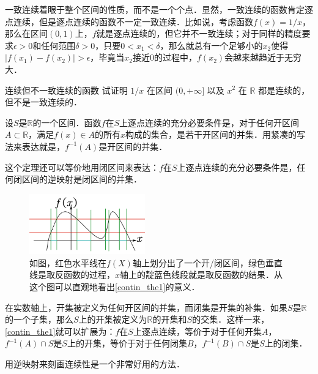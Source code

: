 一致连续着眼于整个区间的性质，而不是一个个点．显然，一致连续的函数肯定逐点连续，但是逐点连续的函数不一定一致连续．比如说，考虑函数$f(x)=1/x$，那么在区间$(0, 1)$上，$f$就是逐点连续的，但它并不一致连续；对于同样的精度要求$\epsilon>0$和任何范围$\delta>0$，只要$0<x_1<\delta$，那么就总有一个足够小的$x_2$使得$|f(x_1)-f(x_2)|>\epsilon$，毕竟当$x_2$接近$0$的过程中，$f(x_2)$会越来越趋近于无穷大．

\begin{exercise}{连续但不一致连续的函数}
试证明 $1/x$ 在区间 $(0, +\infty]$ 以及 $x^2$ 在 $\mathbb R$ 都是连续的， 但不是一致连续的．
\end{exercise}

\begin{theorem}{}\label{contin_the1}
设$S$是$\mathbb{R}$的一个区间．函数$f$在$S$上逐点连续的充分必要条件是，对于任何开区间$A\subset \mathbb{R}$，满足$f(x)\in A$的所有$x$构成的集合，是若干开区间的并集．用紧凑的写法来表达就是，$f^{-1}(A)$是开区间的并集．
\end{theorem}

这个定理还可以等价地用闭区间来表达：$f$在$S$上逐点连续的充分必要条件是，任何闭区间的逆映射是闭区间的并集．

\begin{figure}[ht]
\centering
\includegraphics[width=5cm]{./figures/contin_1.png}
\caption{如图，红色水平线在$f(X)$轴上划分出了一个开/闭区间，绿色垂直线是取反函数的过程，$x$轴上的靛蓝色线段就是取反函数的结果．从这个图可以直观地看出\autoref{contin_the1}的意义．} \label{contin_fig1}
\end{figure}

在实数轴上，开集被定义为任何开区间的并集，而闭集是开集的补集．如果$S$是$\mathbb{R}$的一个子集，那么$S$上的开集被定义为$\mathbb{R}$的开集和$S$的交集．这样一来，\autoref{contin_the1}就可以扩展为：$f$在$S$上逐点连续，等价于对于任何开集$A$，$f^{-1}(A)\cap S$是$S$上的开集，等价于对于任何闭集$B$，$f^{-1}(B)\cap S$是$S$上的闭集．

用逆映射来刻画连续性是一个非常好用的方法．
